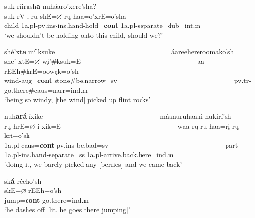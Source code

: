 \begin{exe}
\begin{xlist}
	\item\label{continuativeablaut6}
	
	\glll suk ríirush\textbf{a} nuháaro'xere'sha?\\
	suk rV-i-ru-shE=$\varnothing$ rų-haa=o'xrE=o'sha\\
	\textnormal{child} 1a.pl-pv.ins-ins.hand-\textnormal{hold}=\textbf{cont} 1a.pl-\textnormal{separate}=dub=int.m\\
	\glt `we shouldn't be holding onto this child, should we?' \citep[160]{hollow1973a} 

	\item\label{continuativeablaut7}

	\glll shé'xt\textbf{a} mí'ksuke ~ ~ ~ ~ ~ ~ ~ ~ ~ ~ ~ ~ ~ ~ ~ ~ ~ ~ ~ ~  áareehereroomako'sh\\
	she'-xtE=$\varnothing$ wį'\#ksuk=E ~ ~ ~ ~ ~ ~ ~ ~ ~ ~ ~ ~ ~ ~ ~ ~ ~ ~ ~ ~   aa-rEEh\#hrE=oowąk=o'sh\\
	\textnormal{wind}-aug=\textbf{cont} \textnormal{stone}\#\textnormal{be.narrow}=sv ~ ~ ~ ~ ~ ~ ~ ~ ~ ~ ~ ~ ~ ~ ~ ~ ~ ~ ~ ~  pv.tr-\textnormal{go.there}\#caus=narr=ind.m\\
	\glt `being so windy, [the wind] picked up flint rocks' \citep[49]{hollow1973a}

	\item\label{continuativeablaut8}

	\glll nuh\textbf{ará} íxike ~ ~ ~ ~ ~ ~ ~ ~ ~ ~ ~ ~ ~ ~ ~ ~ ~ ~ ~ ~ máanuruhaani nukirí'sh\\
	rų-hrE=$\varnothing$ i-xik=E ~ ~ ~ ~ ~ ~ ~ ~ ~ ~ ~ ~ ~ ~ ~ ~ ~ ~ ~ ~ waa-rų-ru-haa=rį rų-kri=o'sh\\
	1a.pl-caus=\textbf{cont} pv.ins-\textnormal{be.bad}=sv ~ ~ ~ ~ ~ ~ ~ ~ ~ ~ ~ ~ ~ ~ ~ ~ ~ ~ ~ ~ part-1a.pl-ins.hand-\textnormal{separate}=ss 1a.pl-\textnormal{arrive.back.here}=ind.m\\
	\glt `doing it, we barely picked any [berries] and we came back' \citep[52]{hollow1973a}
	
	\item\label{continuativeablaut5}
	
	\glll sk\textbf{á} réeho'sh\\
	skE=$\varnothing$ rEEh=o'sh\\
	\textnormal{jump}=\textbf{cont} \textnormal{go.there}=ind.m\\
	\glt `he dashes off [lit. he goes there jumping]' \citep[211]{hollow1970}

	\newpage
	\item\label{continuativeablaut9}


\end{xlist}
\end{exe}
